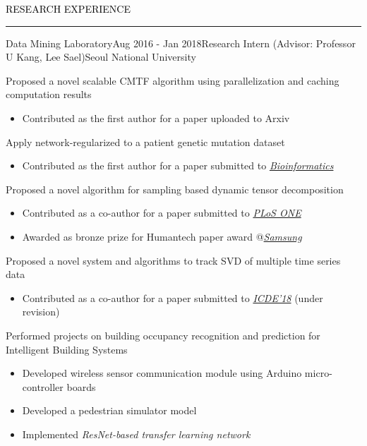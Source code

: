 \documentclass{resume} %
\renewenvironment{rSection}[1]{
	\sectionskip
	\textcolor{Black}{\MakeUppercase{#1}}
	\sectionlineskip
	\hrule
	\begin{list}{}{
			\setlength{\leftmargin}{1.5em}
		}
		\item[]
	}{
	\end{list}
}
\begin{document}
\begin{rSection}{Research Experience}
\begin{rSubsection}{Data Mining Laboratory}{Aug 2016 - Jan 2018}{Research Intern (Advisor: Professor U Kang, Lee Sael)}{Seoul National University}
	\item Proposed a novel scalable CMTF algorithm using parallelization and caching computation results
	\begin{itemize}
		\vspace*{-2.5mm}
		\item Contributed as the first author for a paper uploaded to Arxiv
	\end{itemize}
	\item Apply network-regularized to a patient genetic mutation dataset
	\begin{itemize}
		\vspace*{-2.0mm}
		\item Contributed as the first author for a paper submitted to \href{https://academic.oup.com/bioinformatics}{\textit{Bioinformatics}}
	\end{itemize}
	\item Proposed a novel algorithm for sampling based dynamic tensor decomposition
	\begin{itemize}
		\vspace*{-2.0mm}
		\item Contributed as a co-author for a paper submitted to \href{http://journals.plos.org/plosone/}{\textit{PLoS ONE}}
		\vspace*{-2.0mm}
		\item Awarded as bronze prize for Humantech paper award @\em{\href{https://humantech.samsung.com/saitext/index.jsp}{Samsung}}\em
	\end{itemize}
	\item Proposed a novel system and algorithms to track SVD of multiple time series data
	\begin{itemize}
		\vspace*{-2.0mm}
		\item Contributed as a co-author for a paper submitted to \href{https://icde2018.org/}{\textit{ICDE'18}} (under revision)
	\end{itemize}
	\item Performed projects on building occupancy recognition and prediction for Intelligent Building Systems
	\begin{itemize}
		\vspace*{-2.0mm}
		\item Developed wireless sensor communication module using Arduino micro-controller boards
		\vspace*{-2.0mm}
		\item Developed a pedestrian simulator model
		\vspace*{-2.0mm}
		\item Implemented \em{ResNet}\em-based transfer learning network
	\end{itemize}
\end{rSubsection}
\vspace*{-2.0mm}


\end{rSection}
\end{document}
